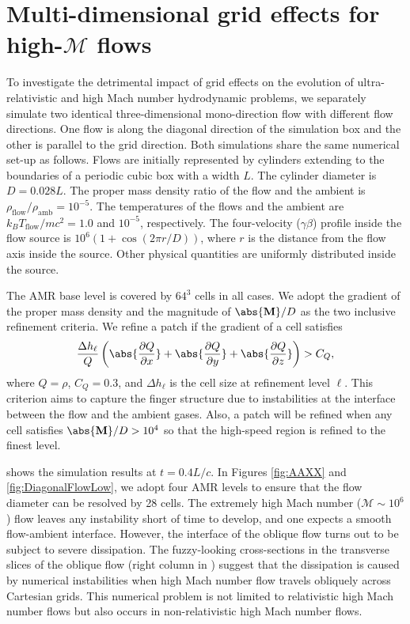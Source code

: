 \section{Multi-dimensional grid effects for high-$\mathscr{M}$ flows}
\label{Multi-dimensional grid effects}
To investigate the detrimental impact of grid effects on the evolution of ultra-relativistic and high Mach number hydrodynamic problems, we separately simulate two identical three-dimensional mono-direction flow with different flow directions. One flow is along the diagonal direction of the simulation box and the other is parallel to the grid direction. Both simulations share the same numerical set-up as follows. Flows are initially represented by cylinders extending to the boundaries of a periodic cubic box with a width $L$. The cylinder diameter is $D=0.028L$. The proper mass density ratio of the flow and the ambient is $\rho_{\text{flow}}/\rho_{\text{amb}}=10^{-5}$. The temperatures of the flows and the ambient are $k_{B}T_{\text{flow}}/mc^2=1.0$ and $10^{-5}$, respectively. The four-velocity ($\gamma \beta$) profile inside the flow source is $10^{6}\left(1+\cos{\left(2\pi r/D\right)}\right)$, where $r$ is the distance from the flow axis inside the source. Other physical quantities are uniformly distributed inside the source.

The AMR base level is covered by $64^{3}$ cells in all cases. We adopt the gradient of the proper mass density and the magnitude of $\abs{\mathbf{M}}/D$ as the two inclusive refinement criteria. We refine a patch if the gradient of a cell satisfies
\begin{equation}
\frac{\Delta h_{\ell}}{Q}
\left(
\abs{\frac{\partial Q}{\partial x}}+
\abs{\frac{\partial Q}{\partial y}}+
\abs{\frac{\partial Q}{\partial z}}
\right)
> C_{Q},
\label{threshold for gradient}
\end{equation}
where $Q=\rho$, $C_{Q}=0.3$, and $\Delta h_{\ell}$ is the cell size at refinement level $\ell$. This criterion aims to capture the finger structure due to instabilities at the interface between the flow and the ambient gases. Also, a patch will be refined when any cell satisfies $\abs{\mathbf{M}}/D>10^{4}$ so that the high-speed region is refined to the finest level.

 shows the simulation results at $t=0.4L/c$. In Figures \ref{fig:AAXX} and \ref{fig:DiagonalFlowLow}, we adopt four AMR levels to ensure that the flow diameter can be resolved by 28 cells. The extremely high Mach number ($\mathscr{M}\sim 10^{6}$) flow leaves any instability short of time to develop, and one expects a smooth flow-ambient interface. However, the interface of the oblique flow turns out to be subject to severe dissipation. The fuzzy-looking cross-sections in the transverse slices of the oblique flow (right column in ) suggest that the dissipation is caused by numerical instabilities when high Mach number flow travels obliquely across Cartesian grids. This numerical problem is not limited to relativistic high Mach number flows but also occurs in non-relativistic high Mach number flows.

